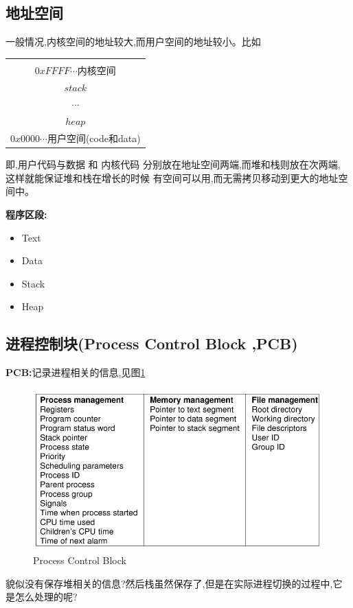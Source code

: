 \documentclass[UTF8,a4paper]{ctexart}
\newcommand{\spaceline}{\vspace{\baselineskip}}
\begin{document}
    \subsection{地址空间}
    一般情况,内核空间的地址较大,而用户空间的地址较小。比如
    \begin{tabular}{|c|}
      \hline\\
      $0xFFFF\cdots$内核空间\\
      $stack$\\
      $\cdots$\\
      $heap$\\
      $0x0000\cdots$用户空间(code和data)\\
      \hline
    \end{tabular}
    即,用户代码与数据 和 内核代码 分别放在地址空间两端,而堆和栈则放在次两端, 这样就能保证堆和栈在增长的时候
    有空间可以用,而无需拷贝移动到更大的地址空间中。

    \spaceline
    \textbf{程序区段:}
    \begin{itemize}
      \item Text
      \item Data
      \item Stack
      \item Heap
    \end{itemize}

    \subsection{进程控制块(Process Control Block ,PCB)}

    \textbf{PCB:}记录进程相关的信息,见图\ref{fig-PCB}

    \begin{figure}[H]
      \centering
      \includegraphics[scale = 0.45]{assets/ModernOperatingSystems_fe620.png}
      \caption{Process Control Block}
      \label{fig-PCB}
    \end{figure}
    {\color{red} 貌似没有保存堆相关的信息?然后栈虽然保存了,但是在实际进程切换的过程中,它是怎么处理的呢?}
\end{document}
